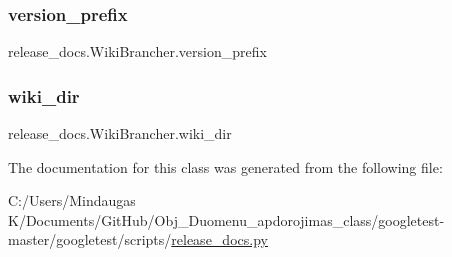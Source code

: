\subsubsection{\texorpdfstring{version\_prefix}{version\_prefix}}
{\footnotesize\ttfamily release\+\_\+docs.\+Wiki\+Brancher.\+version\+\_\+prefix}

\mbox{\label{classrelease__docs_1_1_wiki_brancher_ad86478c9538ac0bf3916f67eb5da2910}} 
\subsubsection{\texorpdfstring{wiki\_dir}{wiki\_dir}}
{\footnotesize\ttfamily release\+\_\+docs.\+Wiki\+Brancher.\+wiki\+\_\+dir}



The documentation for this class was generated from the following file\+:\begin{DoxyCompactItemize}
\item 
C\+:/\+Users/\+Mindaugas K/\+Documents/\+Git\+Hub/\+Obj\+\_\+\+Duomenu\+\_\+apdorojimas\+\_\+class/googletest-\/master/googletest/scripts/\mbox{\hyperlink{googletest-master_2googletest_2scripts_2release__docs_8py}{release\+\_\+docs.\+py}}\end{DoxyCompactItemize}
